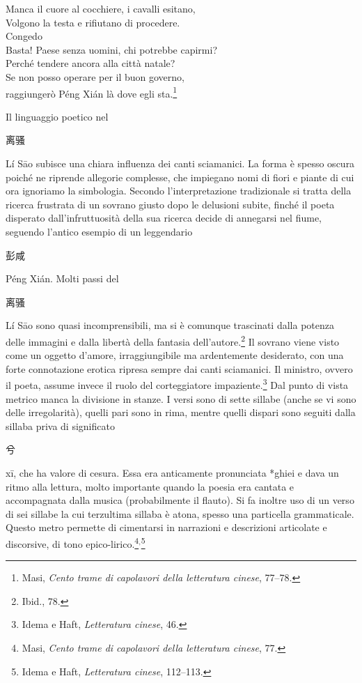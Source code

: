 \documentclass[12pt,titlepage]{article}
\begin{document}
\vspace{-1.5em}
\begin{center}
Manca il cuore al cocchiere, i cavalli esitano,\\
Volgono la testa e rifiutano di procedere.\\
Congedo\\
Basta! Paese senza uomini, chi potrebbe capirmi?\\
Perché tendere ancora alla città natale?\\
Se non posso operare per il buon governo,\\
raggiungerò Péng Xián là dove egli sta.\footnote{Masi, \emph{Cento trame di capolavori della letteratura cinese}, 77–78.}\\
\end{center}
Il linguaggio poetico nel 
 \begin{CJK*}{UTF8}{gbsn}
 离骚 
 \end{CJK*} 
 Lí Sāo subisce una chiara influenza dei canti sciamanici. La forma è spesso oscura poiché ne riprende allegorie complesse, che impiegano nomi di fiori e piante di cui ora ignoriamo la simbologia. Secondo l'interpretazione tradizionale si tratta della ricerca frustrata di un sovrano giusto dopo le delusioni subite, finché il poeta disperato dall'infruttuosità della sua ricerca decide di annegarsi nel fiume, seguendo l'antico esempio di un leggendario 
 \begin{CJK*}{UTF8}{gbsn}彭咸 \end{CJK*} Péng Xián. Molti passi del \begin{CJK*}{UTF8}{gbsn}离骚 \end{CJK*} Lí Sāo sono quasi incomprensibili, ma si è comunque trascinati dalla potenza delle immagini e dalla libertà della fantasia dell'autore.\footnote{Ibid., 78.} Il sovrano viene visto come un oggetto d'amore, irraggiungibile ma ardentemente desiderato, con una forte connotazione erotica ripresa sempre dai canti sciamanici. Il ministro, ovvero il poeta, assume invece il ruolo del corteggiatore impaziente.\footnote{Idema e Haft, \emph{Letteratura cinese}, 46.}
Dal punto di vista metrico manca la divisione in stanze. I versi sono di sette sillabe (anche se vi sono delle irregolarità), quelli pari sono in rima, mentre quelli dispari sono seguiti dalla sillaba priva di significato 
\begin{CJK*}{UTF8}{gbsn}兮 \end{CJK*}
xī, che ha valore di cesura. Essa era anticamente pronunciata *ghiei e dava un ritmo alla lettura, molto importante quando la poesia era cantata e accompagnata dalla musica (probabilmente il flauto). Si fa inoltre uso di un verso di sei sillabe la cui terzultima sillaba è atona, spesso una particella grammaticale. Questo metro permette di cimentarsi in narrazioni e descrizioni articolate e discorsive, di tono epico-lirico.\footnote{Masi, \emph{Cento trame di capolavori della letteratura cinese}, 77.}$^{,}$\footnote{Idema e Haft, \emph{Letteratura cinese}, 112–113.}
\end{document}
